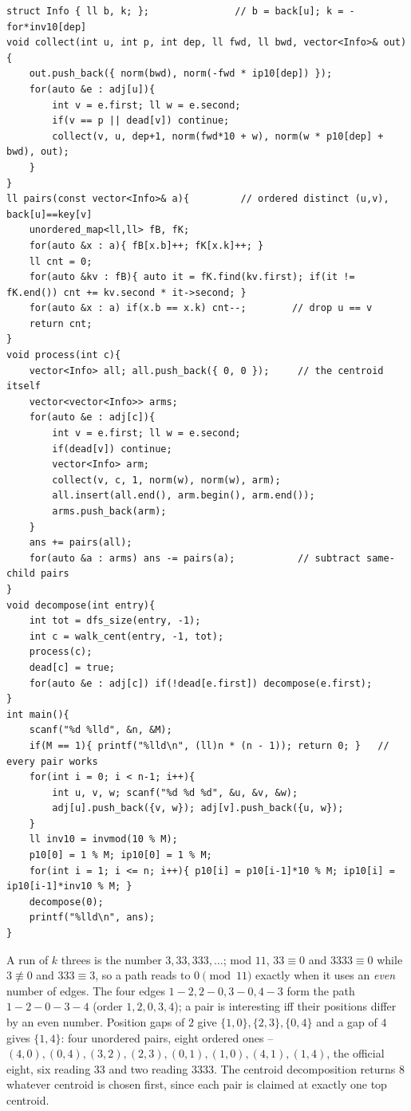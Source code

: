 \begin{lstlisting}
struct Info { ll b, k; };               // b = back[u]; k = -for*inv10[dep]
void collect(int u, int p, int dep, ll fwd, ll bwd, vector<Info>& out){
    out.push_back({ norm(bwd), norm(-fwd * ip10[dep]) });
    for(auto &e : adj[u]){
        int v = e.first; ll w = e.second;
        if(v == p || dead[v]) continue;
        collect(v, u, dep+1, norm(fwd*10 + w), norm(w * p10[dep] + bwd), out);
    }
}
ll pairs(const vector<Info>& a){         // ordered distinct (u,v), back[u]==key[v]
    unordered_map<ll,ll> fB, fK;
    for(auto &x : a){ fB[x.b]++; fK[x.k]++; }
    ll cnt = 0;
    for(auto &kv : fB){ auto it = fK.find(kv.first); if(it != fK.end()) cnt += kv.second * it->second; }
    for(auto &x : a) if(x.b == x.k) cnt--;        // drop u == v
    return cnt;
}
void process(int c){
    vector<Info> all; all.push_back({ 0, 0 });     // the centroid itself
    vector<vector<Info>> arms;
    for(auto &e : adj[c]){
        int v = e.first; ll w = e.second;
        if(dead[v]) continue;
        vector<Info> arm;
        collect(v, c, 1, norm(w), norm(w), arm);
        all.insert(all.end(), arm.begin(), arm.end());
        arms.push_back(arm);
    }
    ans += pairs(all);
    for(auto &a : arms) ans -= pairs(a);           // subtract same-child pairs
}
void decompose(int entry){
    int tot = dfs_size(entry, -1);
    int c = walk_cent(entry, -1, tot);
    process(c);
    dead[c] = true;
    for(auto &e : adj[c]) if(!dead[e.first]) decompose(e.first);
}
int main(){
    scanf("%d %lld", &n, &M);
    if(M == 1){ printf("%lld\n", (ll)n * (n - 1)); return 0; }   // every pair works
    for(int i = 0; i < n-1; i++){
        int u, v, w; scanf("%d %d %d", &u, &v, &w);
        adj[u].push_back({v, w}); adj[v].push_back({u, w});
    }
    ll inv10 = invmod(10 % M);
    p10[0] = 1 % M; ip10[0] = 1 % M;
    for(int i = 1; i <= n; i++){ p10[i] = p10[i-1]*10 % M; ip10[i] = ip10[i-1]*inv10 % M; }
    decompose(0);
    printf("%lld\n", ans);
}
\end{lstlisting}

\begin{tracebox}[Sample 2: \(n=5\), \(M=11\), every edge digit \(=3\)]
A run of \(k\) threes is the number \(3,33,333,\dots\); mod \(11\), \(33\equiv 0\)
and \(3333\equiv 0\) while \(3\not\equiv 0\) and \(333\equiv 3\), so a path reads to
\(0\pmod{11}\) exactly when it uses an \emph{even} number of edges. The four edges
\(1\!-\!2,2\!-\!0,3\!-\!0,4\!-\!3\) form the path \(1\!-\!2\!-\!0\!-\!3\!-\!4\)
(order \(1,2,0,3,4\)); a pair is interesting iff their positions differ by an even
number. Position gaps of \(2\) give \(\{1,0\},\{2,3\},\{0,4\}\) and a gap of \(4\)
gives \(\{1,4\}\): four unordered pairs, eight ordered ones --
\((4,0),(0,4),(3,2),(2,3),(0,1),(1,0),(4,1),(1,4)\), the official eight, six reading
\(33\) and two reading \(3333\). The centroid decomposition returns \(\boxed{8}\)
whatever centroid is chosen first, since each pair is claimed at exactly one top
centroid.
\end{tracebox}

